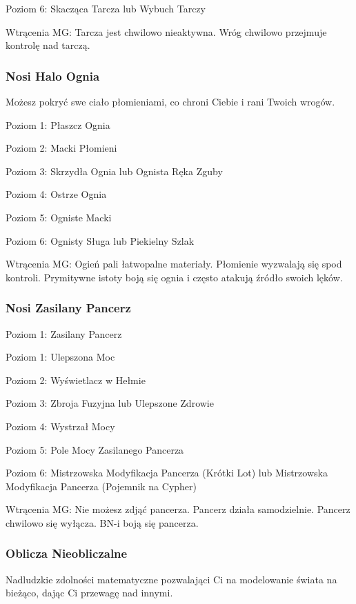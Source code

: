 Poziom 6: Skacząca Tarcza lub Wybuch Tarczy

Wtrącenia MG: Tarcza jest chwilowo nieaktywna. Wróg chwilowo przejmuje kontrolę nad tarczą.

\subsubsection{Nosi Halo Ognia}

Możesz pokryć swe ciało płomieniami, co chroni Ciebie i rani Twoich wrogów. 

Poziom 1: Płaszcz Ognia

Poziom 2: Macki Płomieni

Poziom 3: Skrzydła Ognia lub Ognista Ręka Zguby

Poziom 4: Ostrze Ognia

Poziom 5: Ogniste Macki

Poziom 6: Ognisty Sługa lub Piekielny Szlak

Wtrącenia MG: Ogień pali łatwopalne materiały. Płomienie wyzwalają się spod kontroli. Prymitywne istoty boją się ognia i często atakują źródło swoich lęków. 

\subsubsection{Nosi Zasilany Pancerz}

Poziom 1: Zasilany Pancerz

Poziom 1: Ulepszona Moc

Poziom 2: Wyświetlacz w Hełmie

Poziom 3: Zbroja Fuzyjna lub Ulepszone Zdrowie

Poziom 4: Wystrzał Mocy

Poziom 5: Pole Mocy Zasilanego Pancerza

Poziom 6: Mistrzowska Modyfikacja Pancerza (Krótki Lot) lub Mistrzowska Modyfikacja Pancerza (Pojemnik na Cypher)

Wtrącenia MG: Nie możesz zdjąć pancerza. Pancerz działa samodzielnie. Pancerz chwilowo się wyłącza. BN-i boją się pancerza. 

\subsubsection{Oblicza Nieobliczalne}

Nadludzkie zdolności matematyczne pozwalająci Ci na modelowanie świata na bieżąco, dając Ci przewagę nad innymi. 

